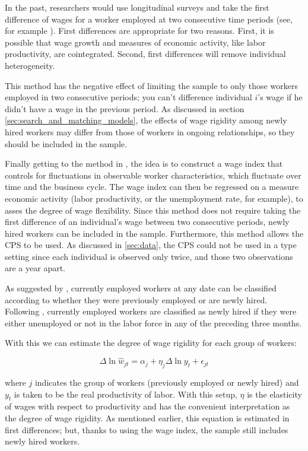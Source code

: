 \documentclass[11pt]{article}
\begin{document}
In the past, researchers would use longitudinal surveys and take the first difference of wages for a worker employed at two consecutive time periods (see, for example \cite{bils_1985}).
First differences are appropriate for two reasons.
First, it is possible that wage growth and measures of economic activity, like labor productivity, are cointegrated.
Second, first differences will remove individual heterogeneity.

This method has the negative effect of limiting the sample to only those workers employed in two consecutive periods;
you can't difference individual $i$'s wage if he didn't have a wage in the previous period.
As discussed in section \autoref{sec:search_and_matching_models}, the effects of wage rigidity among newly hired workers may differ from those of workers in ongoing relationships, so they should be included in the sample.

Finally getting to the method in \cite{haefke_sonntag_vanRens_2013}, the idea is to construct a wage index that controls for fluctuations in observable worker characteristics, which fluctuate over time and the business cycle.
The wage index can then be regressed on a measure economic activity (labor productivity, or the unemployment rate, for example), to asses the degree of wage flexibility.
Since this method does not require taking the first difference of an individual's wage between two consecutive periods, newly hired workers can be included in the sample.
Furthermore, this method allows the CPS to be used.
As discussed in \autoref{sec:data}, the CPS could not be used in a \cite{bils_1985} type setting since each individual is observed only twice, and those two observations are a year apart.

As suggested by \cite{pissarides_2009}, currently employed workers at any date can be classified according to whether they were previously employed or are newly hired.
Following \cite{haefke_sonntag_vanRens_2013}, currently employed workers are classified as newly hired if they were either unemployed or not in the labor force in any of the preceding three months.

With this we can estimate the degree of wage rigidity for each group of workers:

\begin{equation}
    \label{eq:second_stage}
    \Delta \ln \hat{w}_{jt} = \alpha_j + \eta_j \Delta \ln y_t + \epsilon_{jt}
\end{equation}

where $j$ indicates the group of workers (previously employed or newly hired) and $y_t$ is taken to be the real productivity of labor.
With this setup, $\eta$ is the elasticity of wages with respect to productivity and has the convenient interpretation as the degree of wage rigidity.
As mentioned earlier, this equation is estimated in first differences;
but, thanks to using the wage index, the sample still includes newly hired workers.
\end{document}
